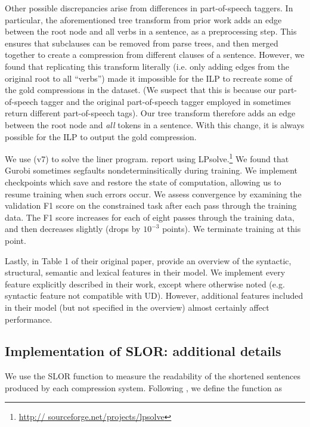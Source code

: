 Other possible discrepancies arise from differences in part-of-speech taggers. In particular, the aforementioned tree transform from prior work adds an edge between the root node and all verbs in a sentence, as a preprocessing step. This ensures that subclauses can be removed from parse trees, and then merged together to create a compression from different clauses of a sentence. However, we found that replicating this transform literally (i.e. only adding edges from the original root to all ``verbs'') made it impossible for the ILP to recreate some of the gold compressions in the dataset. (We suspect that this is because our part-of-speech tagger and the original part-of-speech tagger employed in \citet{filippova2013overcoming} sometimes return different part-of-speech tags). Our tree transform therefore adds an edge between the root node and \textit{all} tokens in a sentence. With this change, it is always possible for the ILP to output the gold compression.

We use \citet{gurobi} (v7) to solve the liner program. \citet{filippova2008dependency} report using LPsolve.\footnote{\url{http://
sourceforge.net/projects/lpsolve}}  We found that Gurobi sometimes segfaults nondeterminsitically during training. We implement checkpoints which save and restore the state of computation, allowing us to resume training when such errors occur.  We assess convergence by examining the validation F1 score on the constrained task after each pass through the training data. The F1 score increases for each of eight passes through the training data, and then decreases slightly (drops by $10^{-3}$ points). We terminate training at this point. 

Lastly, in Table 1 of their original paper, \citet{filippova2013overcoming} provide an overview of the syntactic, structural, semantic and lexical features in their model. We implement every feature explicitly described in their work, except where otherwise noted (e.g. syntactic feature not compatible with UD). However, additional features included in their model (but not specified in the overview) almost certainly affect performance. 

\subsection{Implementation of SLOR: additional details}

We use the SLOR function to measure the readability of the shortened sentences produced by each compression system. Following \cite{lau2015unsupervised}, we define the function as 


